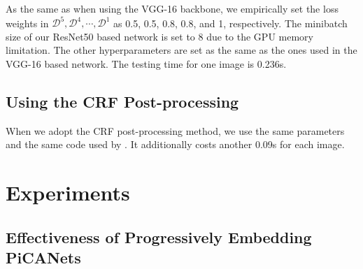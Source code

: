 \documentclass[10pt,twocolumn,letterpaper]{article}
\begin{document}
As the same as when using the VGG-16 backbone, we empirically set the loss weights in $\mathcal D^5,\mathcal D^4,\cdots,\mathcal D^1$ as 0.5, 0.5, 0.8, 0.8, and 1, respectively. The minibatch size of our ResNet50 based network is set to 8 due to the GPU memory limitation. The other hyperparameters are set as the same as the ones used in the VGG-16 based network. The testing time for one image is 0.236s.

\subsection{Using the CRF Post-processing}

When we adopt the CRF post-processing method, we use the same parameters and the same code used by \cite{hou2017dss}. It additionally costs another 0.09s for each image.


\section{Experiments}

\subsection{Effectiveness of Progressively Embedding PiCANets}
\end{document}
